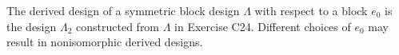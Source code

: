 The derived design of a symmetric block design $\Lambda$ with respect to a block $e_0$ is the design $\Lambda_2$ constructed from $\Lambda$ in Exercise C24. Different choices of $e_0$ may result in nonisomorphic derived designs.
